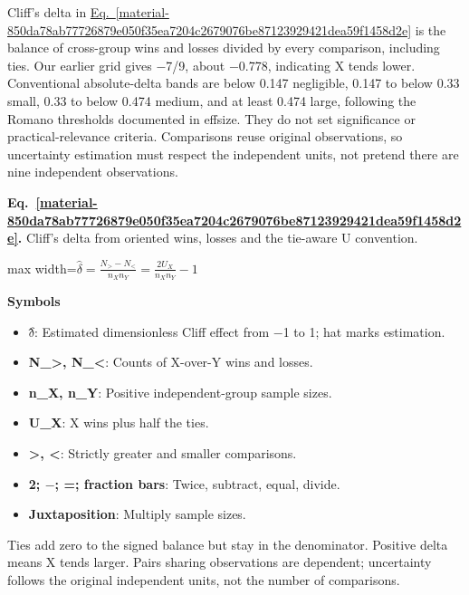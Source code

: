 \documentclass[11pt,a4paper]{article}
\begin{document}
Cliff's delta in \hyperref[material-850da78ab77726879e050f35ea7204c2679076be87123929421dea59f1458d2e]{Eq.~\ref*{material-850da78ab77726879e050f35ea7204c2679076be87123929421dea59f1458d2e}} is the balance of cross-group wins and losses divided by every comparison, including ties. Our earlier grid gives \ensuremath{-}7/9, about \ensuremath{-}0.778, indicating X tends lower. Conventional absolute-delta bands are below 0.147 negligible, 0.147 to below 0.33 small, 0.33 to below 0.474 medium, and at least 0.474 large, following the Romano thresholds documented in effsize. They do not set significance or practical-relevance criteria. Comparisons reuse original observations, so uncertainty estimation must respect the independent units, not pretend there are nine independent observations.


\par\medskip
\noindent\begin{minipage}{\linewidth}
\label{material-850da78ab77726879e050f35ea7204c2679076be87123929421dea59f1458d2e}
\noindent\textbf{Eq.~\ref*{material-850da78ab77726879e050f35ea7204c2679076be87123929421dea59f1458d2e}.} Cliff's delta from oriented wins, losses and the tie-aware U convention.\par\nopagebreak
\begin{center}\begin{adjustbox}{max width=\linewidth}$\displaystyle \widehat\delta=\frac{N_>-N_<}{n_X n_Y}=\frac{2U_X}{n_X n_Y}-1$\end{adjustbox}\end{center}

\par\noindent\textbf{Symbols}

\begin{itemize}\setlength{\itemsep}{1pt}\setlength{\parsep}{0pt}
\item \textbf{\ensuremath{\delta}̂}: Estimated dimensionless Cliff effect from \ensuremath{-}1 to 1; hat marks estimation.
\item \textbf{N\_>, N\_<}: Counts of X-over-Y wins and losses.
\item \textbf{n\_X, n\_Y}: Positive independent-group sample sizes.
\item \textbf{U\_X}: X wins plus half the ties.
\item \textbf{>, <}: Strictly greater and smaller comparisons.
\item \textbf{2; \ensuremath{-}; =; fraction bars}: Twice, subtract, equal, divide.
\item \textbf{Juxtaposition}: Multiply sample sizes.
\end{itemize}

Ties add zero to the signed balance but stay in the denominator. Positive delta means X tends larger. Pairs sharing observations are dependent; uncertainty follows the original independent units, not the number of comparisons.

\end{minipage}\par
\medskip
\end{document}
